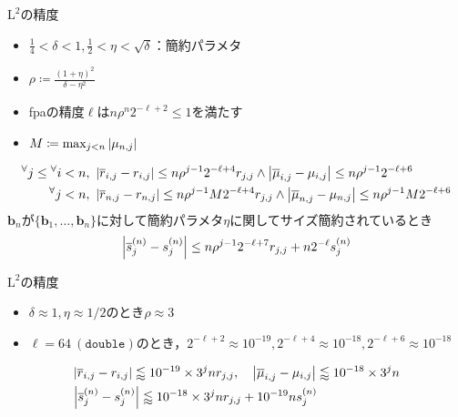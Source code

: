 \documentclass[12pt,aspectratio=169,table,dvipdfmx, leqno]{beamer}
\begin{document}
\begin{frame}{$\text{L}^2$の精度}
\begin{itemize}
    \item $\frac{1}{4}<\delta<1, \frac{1}{2}<\eta<\sqrt{\delta}$：簡約パラメタ
    \item $\rho\coloneqq \frac{(1+\eta)^2}{\delta-\eta^2}$
    \item fpaの精度$\ell$は$n\rho^n 2^{-\ell+2}\le 1$を満たす
    \item $M\coloneqq \max_{j<n} \abs{\mu_{n, j}}$
\end{itemize}
\begin{align}
    {}^\forall j\le{}^\forall i<n&,~\abs{\overline{r}_{i, j}-r_{i, j}}\le n\rho^{j-1}2^{-\ell+4}r_{j, j}\land \abs{\overline{\mu}_{i, j}-\mu_{i, j}}\le n\rho^{j-1}2^{-\ell+6}\\
    {}^\forall j < n&,~\abs{\overline{r}_{n, j}-r_{n, j}}\le n\rho^{j-1}M2^{-\ell+4}r_{j, j}\land \abs{\overline{\mu}_{n, j}-\mu_{n, j}}\le n\rho^{j-1}M2^{-\ell+6}
\end{align}
$\bm{b}_n$が$\{\bm{b}_1,\ldots,\bm{b}_n\}$に対して簡約パラメタ$\eta$に関してサイズ簡約されているとき
\begin{equation}
    \abs{\overline{s}_{j}^{(n)}-s_{j}^{(n)}}\le n\rho^{j-1}2^{-\ell+7}r_{j, j}+n2^{-\ell}s_{j}^{(n)}
\end{equation}
\end{frame}

\begin{frame}{$\text{L}^2$の精度}
\begin{itemize}
    \item $\delta\approx 1, \eta\approx 1/2$のとき$\rho\approx 3$
    \item $\ell=64~(\texttt{double})$のとき，$2^{-\ell+2}\approx 10^{-19}, 2^{-\ell+4}\approx 10^{-18}, 2^{-\ell+6}\approx 10^{-18}$
\end{itemize}
\begin{align*}
&\abs{\overline{r}_{i, j}-r_{i, j}}\lessapprox 10^{-19}\times 3^jn r_{j, j}, \quad\abs{\overline{\mu}_{i, j}-\mu_{i, j}}\lessapprox 10^{-18}\times 3^{j}n\\
&\abs{\overline{s}_{j}^{(n)}-s_{j}^{(n)}}\lessapprox 10^{-18}\times 3^j nr_{j, j}+10^{-19}ns_{j}^{(n)}
\end{align*}
\end{frame}
\end{document}

